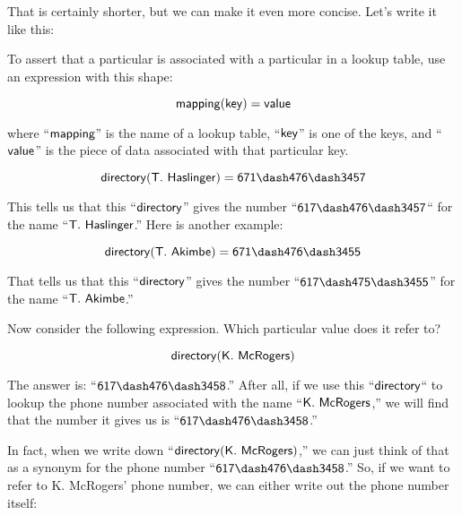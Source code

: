 \documentclass[../../../main.tex]{subfiles}
\begin{document}
That is certainly shorter, but we can make it even more concise. Let's write it like this:

\begin{aside}
  \begin{notation}
    To assert that a particular  is associated with a particular  in a lookup table, use an expression with this shape:
    
    \begin{equation*}
      \mathsf{mapping(key) = value}
    \end{equation*}
    
    where ``$\mathsf{mapping}$'' is the name of a lookup table, ``$\mathsf{key}$'' is one of the keys, and ``$\mathsf{value}$'' is the piece of data associated with that particular key.
  \end{notation}
\end{aside}

\begin{equation*}
  \e{directory(T.~Haslinger) = 671\dash476\dash3457}
\end{equation*}

This tells us that this ``$\mathsf{directory}$'' gives the number ``$\e{617\dash476\dash3457}$`` for the name ``$\mathsf{T.~Haslinger}$.'' Here is another example:

\begin{equation*}
  \e{directory(T.~Akimbe) = 671\dash476\dash3455}
\end{equation*}

That tells us that this ``$\mathsf{directory}$'' gives the number ``$\e{617\dash475\dash3455}$'' for the name ``$\mathsf{T.~Akimbe}$.''

Now consider the following expression. Which particular value does it refer to?

\begin{equation*}
  \mathsf{directory(K.~McRogers)}
\end{equation*}

The answer is: ``$\e{617\dash476\dash3458}$.'' After all, if we use this ``$\mathsf{directory}$`` to lookup the phone number associated with the name ``$\mathsf{K.~McRogers}$,'' we will find that the number it gives us is ``$\e{617\dash476\dash3458}$.''

In fact, when we write down ``$\mathsf{directory(K.~McRogers)}$,'' we can just think of that as a synonym for the phone number ``$\e{617\dash476\dash3458}$.'' So, if we want to refer to K. McRogers' phone number, we can either write out the phone number itself:
\end{document}
